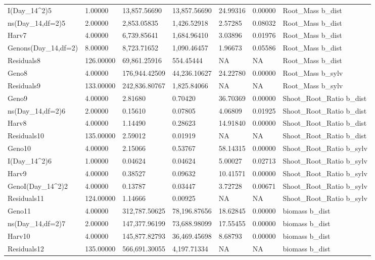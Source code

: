 \documentclass[jou,floatsintext]{apa6}
\begin{document}
\begin{table}[tbp]
\begin{center}
\begin{threeparttable}
{\begin{tabular}{lllllll}
I(Day\_14\textasciicircum{}2)5 & 1.00000 & 13,857.56690 & 13,857.56690 & 24.99316 & 0.00000 & Root\_Mass b\_dist\\
ns(Day\_14,df=2)5 & 2.00000 & 2,853.05835 & 1,426.52918 & 2.57285 & 0.08032 & Root\_Mass b\_dist\\
Harv7 & 4.00000 & 6,739.85641 & 1,684.96410 & 3.03896 & 0.01976 & Root\_Mass b\_dist\\
Genons(Day\_14,df=2) & 8.00000 & 8,723.71652 & 1,090.46457 & 1.96673 & 0.05586 & Root\_Mass b\_dist\\
Residuals8 & 126.00000 & 69,861.25916 & 554.45444 & NA & NA & Root\_Mass b\_dist\\
Geno8 & 4.00000 & 176,944.42509 & 44,236.10627 & 24.22780 & 0.00000 & Root\_Mass b\_sylv\\
Residuals9 & 133.00000 & 242,836.80767 & 1,825.84066 & NA & NA & Root\_Mass b\_sylv\\
Geno9 & 4.00000 & 2.81680 & 0.70420 & 36.70369 & 0.00000 & Shoot\_Root\_Ratio b\_dist\\
ns(Day\_14,df=2)6 & 2.00000 & 0.15610 & 0.07805 & 4.06809 & 0.01925 & Shoot\_Root\_Ratio b\_dist\\
Harv8 & 4.00000 & 1.14490 & 0.28623 & 14.91840 & 0.00000 & Shoot\_Root\_Ratio b\_dist\\
Residuals10 & 135.00000 & 2.59012 & 0.01919 & NA & NA & Shoot\_Root\_Ratio b\_dist\\
Geno10 & 4.00000 & 2.15066 & 0.53767 & 58.14315 & 0.00000 & Shoot\_Root\_Ratio b\_sylv\\
I(Day\_14\textasciicircum{}2)6 & 1.00000 & 0.04624 & 0.04624 & 5.00027 & 0.02713 & Shoot\_Root\_Ratio b\_sylv\\
Harv9 & 4.00000 & 0.38527 & 0.09632 & 10.41571 & 0.00000 & Shoot\_Root\_Ratio b\_sylv\\
GenoI(Day\_14\textasciicircum{}2)2 & 4.00000 & 0.13787 & 0.03447 & 3.72728 & 0.00671 & Shoot\_Root\_Ratio b\_sylv\\
Residuals11 & 124.00000 & 1.14666 & 0.00925 & NA & NA & Shoot\_Root\_Ratio b\_sylv\\
Geno11 & 4.00000 & 312,787.50625 & 78,196.87656 & 18.62845 & 0.00000 & biomass b\_dist\\
ns(Day\_14,df=2)7 & 2.00000 & 147,377.96199 & 73,688.98099 & 17.55455 & 0.00000 & biomass b\_dist\\
Harv10 & 4.00000 & 145,877.82793 & 36,469.45698 & 8.68793 & 0.00000 & biomass b\_dist\\
Residuals12 & 135.00000 & 566,691.30055 & 4,197.71334 & NA & NA & biomass b\_dist\\

\end{tabular}}
\end{threeparttable}
\end{center}
\end{table}
\end{document}
